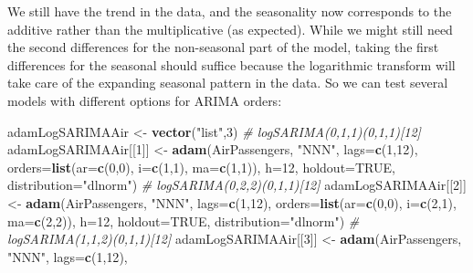 \documentclass[]{book}
\newenvironment{Shaded}{\begin{snugshade}}{\end{snugshade}}
\newcommand{\CommentTok}[1]{\textcolor[rgb]{0.56,0.35,0.01}{\textit{#1}}}
\newcommand{\DataTypeTok}[1]{\textcolor[rgb]{0.13,0.29,0.53}{#1}}
\newcommand{\DecValTok}[1]{\textcolor[rgb]{0.00,0.00,0.81}{#1}}
\newcommand{\KeywordTok}[1]{\textcolor[rgb]{0.13,0.29,0.53}{\textbf{#1}}}
\newcommand{\NormalTok}[1]{#1}
\newcommand{\OtherTok}[1]{\textcolor[rgb]{0.56,0.35,0.01}{#1}}
\newcommand{\StringTok}[1]{\textcolor[rgb]{0.31,0.60,0.02}{#1}}
\theoremstyle{definition}
\theoremstyle{definition}
\theoremstyle{definition}
\theoremstyle{definition}
\theoremstyle{remark}
\begin{document}
We still have the trend in the data, and the seasonality now corresponds to the additive rather than the multiplicative (as expected). While we might still need the second differences for the non-seasonal part of the model, taking the first differences for the seasonal should suffice because the logarithmic transform will take care of the expanding seasonal pattern in the data. So we can test several models with different options for ARIMA orders:

\begin{Shaded}
\begin{Highlighting}[]
\NormalTok{adamLogSARIMAAir <-}\StringTok{ }\KeywordTok{vector}\NormalTok{(}\StringTok{"list"}\NormalTok{,}\DecValTok{3}\NormalTok{)}
\CommentTok{# logSARIMA(0,1,1)(0,1,1)[12]}
\NormalTok{adamLogSARIMAAir[[}\DecValTok{1}\NormalTok{]] <-}
\StringTok{  }\KeywordTok{adam}\NormalTok{(AirPassengers, }\StringTok{"NNN"}\NormalTok{, }\DataTypeTok{lags=}\KeywordTok{c}\NormalTok{(}\DecValTok{1}\NormalTok{,}\DecValTok{12}\NormalTok{),}
       \DataTypeTok{orders=}\KeywordTok{list}\NormalTok{(}\DataTypeTok{ar=}\KeywordTok{c}\NormalTok{(}\DecValTok{0}\NormalTok{,}\DecValTok{0}\NormalTok{), }\DataTypeTok{i=}\KeywordTok{c}\NormalTok{(}\DecValTok{1}\NormalTok{,}\DecValTok{1}\NormalTok{), }\DataTypeTok{ma=}\KeywordTok{c}\NormalTok{(}\DecValTok{1}\NormalTok{,}\DecValTok{1}\NormalTok{)),}
       \DataTypeTok{h=}\DecValTok{12}\NormalTok{, }\DataTypeTok{holdout=}\OtherTok{TRUE}\NormalTok{, }\DataTypeTok{distribution=}\StringTok{"dlnorm"}\NormalTok{)}
\CommentTok{# logSARIMA(0,2,2)(0,1,1)[12]}
\NormalTok{adamLogSARIMAAir[[}\DecValTok{2}\NormalTok{]] <-}
\StringTok{  }\KeywordTok{adam}\NormalTok{(AirPassengers, }\StringTok{"NNN"}\NormalTok{, }\DataTypeTok{lags=}\KeywordTok{c}\NormalTok{(}\DecValTok{1}\NormalTok{,}\DecValTok{12}\NormalTok{),}
       \DataTypeTok{orders=}\KeywordTok{list}\NormalTok{(}\DataTypeTok{ar=}\KeywordTok{c}\NormalTok{(}\DecValTok{0}\NormalTok{,}\DecValTok{0}\NormalTok{), }\DataTypeTok{i=}\KeywordTok{c}\NormalTok{(}\DecValTok{2}\NormalTok{,}\DecValTok{1}\NormalTok{), }\DataTypeTok{ma=}\KeywordTok{c}\NormalTok{(}\DecValTok{2}\NormalTok{,}\DecValTok{2}\NormalTok{)),}
       \DataTypeTok{h=}\DecValTok{12}\NormalTok{, }\DataTypeTok{holdout=}\OtherTok{TRUE}\NormalTok{, }\DataTypeTok{distribution=}\StringTok{"dlnorm"}\NormalTok{)}
\CommentTok{# logSARIMA(1,1,2)(0,1,1)[12]}
\NormalTok{adamLogSARIMAAir[[}\DecValTok{3}\NormalTok{]] <-}
\StringTok{  }\KeywordTok{adam}\NormalTok{(AirPassengers, }\StringTok{"NNN"}\NormalTok{, }\DataTypeTok{lags=}\KeywordTok{c}\NormalTok{(}\DecValTok{1}\NormalTok{,}\DecValTok{12}\NormalTok{),}

\end{Highlighting}
\end{Shaded}
\end{document}
